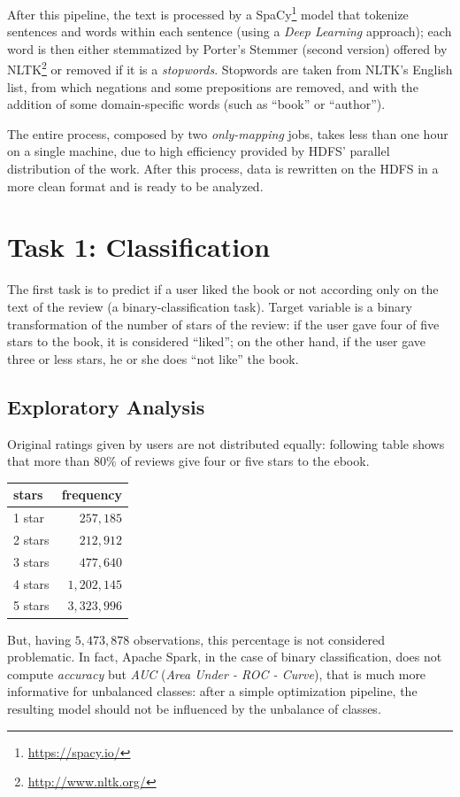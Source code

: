 \documentclass[fleqn,10pt]{SelfArx}
\begin{document}
After this pipeline, the text is processed by a SpaCy\footnote{\url{https://spacy.io/}} model that tokenize sentences and words within each sentence (using a \textit{Deep Learning} approach); each word is then either stemmatized by Porter's Stemmer (second version) offered by NLTK\footnote{\url{http://www.nltk.org/}} or removed if it is a \textit{stopwords}.
Stopwords are taken from NLTK's English list, from which negations and some prepositions are removed, and with the addition of some domain-specific words (such as ``book'' or ``author''). \newline

The entire process, composed by two \textit{only-mapping} jobs, takes less than one hour on a single machine, due to high efficiency provided by HDFS' parallel distribution of the work.
After this process, data is rewritten on the HDFS in a more clean format and is ready to be analyzed.

\newpage
\section{Task 1: Classification}
The first task is to predict if a user liked the book or not according only on the text of the review (a binary-classification task).
Target variable is a binary transformation of the number of stars of the review: if the user gave four of five stars to the book, it is considered ``liked''; on the other hand, if the user gave three or less stars, he or she does ``not like'' the book.

\subsection{Exploratory Analysis}
Original ratings given by users are not distributed equally: following table shows that more than $80\%$ of reviews give four or five stars to the ebook.
\begin{center}
  \begin{tabular}{l|r}
    stars & frequency \\
    \hline
    1 star  & $257,185$ \\
    2 stars & $212,912$ \\
    3 stars & $477,640$ \\
    4 stars & $1,202,145$ \\
    5 stars & $3,323,996$
  \end{tabular}
\end{center}
But, having $5,473,878$ observations, this percentage is not considered problematic.
In fact, Apache Spark, in the case of binary classification, does not compute \textit{accuracy} but \textit{AUC} (\textit{Area Under - ROC - Curve}), that is much more informative for unbalanced classes: after a simple optimization pipeline, the resulting model should not be influenced by the unbalance of classes.
\end{document}
